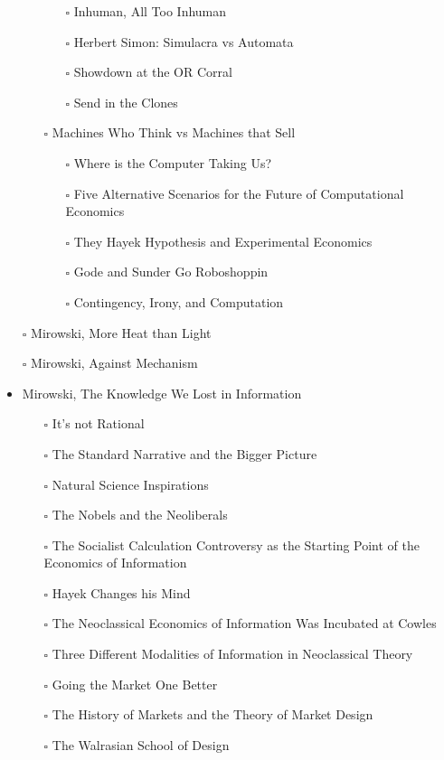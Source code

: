 \documentclass[paper=B6,portrait,twoside=true,twocolumn=false,headinclude=true,footinclude=false,fontsize=12,BCOR=10mm,DIV=calc,pagesize=auto,titlepage=firstiscover,mpinclude=false,headings=normal,headings=twolinechapter,open=right,toc=graduated,chapterprefix=false,numbers=endperiod,parskip=half+]{scrbook}
\theoremstyle{definition}
\begin{document}
\begin{itemize}
\begin{itemize}
\begin{itemize}
\item[{$\square$}] Inhuman, All Too Inhuman
\item[{$\square$}] Herbert Simon: Simulacra vs Automata
\item[{$\square$}] Showdown at the OR Corral
\item[{$\square$}] Send in the Clones
\end{itemize}
\item[{$\square$}] Machines Who Think vs Machines that Sell
\begin{itemize}
\item[{$\square$}] Where is the Computer Taking Us?
\item[{$\square$}] Five Alternative Scenarios for the Future of Computational
Economics
\item[{$\square$}] They Hayek Hypothesis and Experimental Economics
\item[{$\square$}] Gode and Sunder Go Roboshoppin
\item[{$\square$}] Contingency, Irony, and Computation
\end{itemize}
\end{itemize}
\item[{$\square$}] Mirowski, More Heat than Light
\item[{$\square$}] Mirowski, Against Mechanism
\item\relax [0/17] Mirowski, The Knowledge We Lost in Information
\begin{itemize}
\item[{$\square$}] It's not Rational
\item[{$\square$}] The Standard Narrative and the Bigger Picture
\item[{$\square$}] Natural Science Inspirations
\item[{$\square$}] The Nobels and the Neoliberals
\item[{$\square$}] The Socialist Calculation Controversy as the Starting Point of the
Economics of Information
\item[{$\square$}] Hayek Changes his Mind
\item[{$\square$}] The Neoclassical Economics of Information Was Incubated at Cowles
\item[{$\square$}] Three Different Modalities of Information in Neoclassical Theory
\item[{$\square$}] Going the Market One Better
\item[{$\square$}] The History of Markets and the Theory of Market Design
\item[{$\square$}] The Walrasian School of Design

\end{itemize}
\end{itemize}
\end{document}

